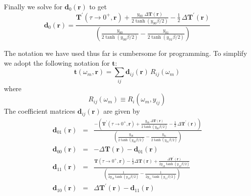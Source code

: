 Finally we solve for $\mathbf{d}_0(\mathbf{r})$ to get
\begin{equation}
 \mathbf{d}_0(\mathbf{r}) =
\frac{
\mathbf{T}^{\prime}(\tau \to 0^+, \mathbf{r}) + 
{\displaystyle
\frac{
y_{00}\;\Delta \mathbf{T}(\mathbf{r})}
{2 \tanh(y_{00} \beta /2)}}
-
\frac{1}{2}\,\Delta \mathbf{T}^{\prime}(\mathbf{r})}
{\displaystyle
\left(\frac{y_{00}}{2\tanh(y_{00}\beta /2)}
- \frac{y_{01}}{2 \tanh(y_{01}\beta /2)} \right)
}
\end{equation}

The notation we have used thus far is cumbersome for
programming.  To simplify we adopt the following notation
for $\mathbf{t}$:
\begin{equation}
\mathbf{t}(\omega_m,\mathbf{r}) = \sum_{ij} \mathbf{d}_{ij}(\mathbf{r})\,
R_{ij}(\omega_m)
\end{equation}
where
\begin{equation}
R_{ij}(\omega_m) \equiv R_i(\omega_m,y_{ij})
\end{equation}
The coefficient matrices $\mathbf{d}_{ij}(\mathbf{r})$
are given by
\begin{eqnarray}
\mathbf{d}_{01}(\mathbf{r}) & = &
\frac{-\left(
\mathbf{T}^{\prime}(\tau \to 0^+, \mathbf{r}) + 
{\displaystyle
\frac{
y_{00}\;\Delta \mathbf{T}(\mathbf{r})}
{2 \tanh(y_{00} \beta /2)}}
-
\frac{1}{2}\,\Delta \mathbf{T}^{\prime}(\mathbf{r})\right)}
{\displaystyle
\left(\frac{y_{00}}{2\tanh(y_{00}\beta /2)}
- \frac{y_{01}}{2 \tanh(y_{01}\beta /2)} \right)
} \\
\mathbf{d}_{00}(\mathbf{r}) & = & -\Delta \mathbf{T}(\mathbf{r})
 - \mathbf{d}_{01}(\mathbf{r}) \\
\mathbf{d}_{11}(\mathbf{r}) & = &
\frac{
\mathbf{T}(\tau \to 0^+, \mathbf{r}) 
- \frac{1}{2} \Delta \mathbf{T}(\mathbf{r}) + 
{\displaystyle \frac{\Delta \mathbf{T}^{\prime}(\mathbf{r})}
{2y_{10} \tanh(y_{10} \beta /2)}}
}
{\displaystyle \left(
 \frac{1}{2y_{10} \tanh(y_{10} \beta /2)} -
\frac{1}{2y_{11} \tanh(y_{11} \beta /2)} \right)
} \\
\mathbf{d}_{10}(\mathbf{r}) & = & \Delta \mathbf{T}^{\prime}(\mathbf{r})
 - \mathbf{d}_{11}(\mathbf{r}) 
\end{eqnarray}